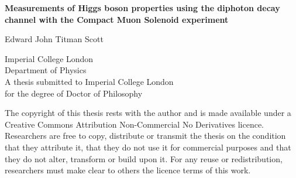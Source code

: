 \begin{titlepage}
    \begin{center}
        \vspace*{2cm}
        
        \huge{\textbf{Measurements of Higgs boson properties using the diphoton decay channel with the Compact Muon Solenoid experiment}}

        \vspace{1.5cm}
        \normalsize
        Edward John Titman Scott
        
        \vspace{0.5cm}
        Imperial College London\\
        Department of Physics\\

        \vspace{5cm}
        A thesis submitted to Imperial College London\\
        for the degree of Doctor of Philosophy\\
        
    \end{center}
\end{titlepage}

The copyright of this thesis rests with the author and is made available under a Creative Commons Attribution Non-Commercial No Derivatives licence. Researchers are free to copy, distribute or transmit the thesis on the condition that they attribute it, that they do not use it for commercial purposes and that they do not alter, transform or build upon it. For any reuse or redistribution, researchers must make clear to others the licence terms of this work.
